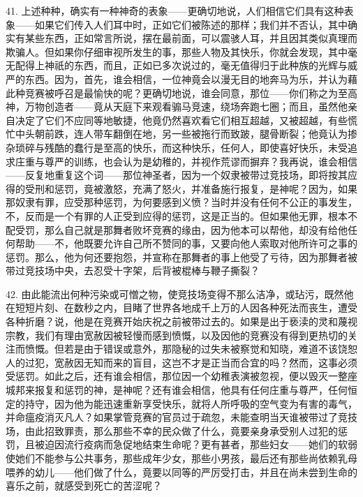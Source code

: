 41. 上述种种，确实有一种神奇的表象——更确切地说，人们相信它们具有这种表象——如果它们传入人们耳中时，正如它们被陈述的那样；我们并不否认，其中确实有某些东西，正如常言所说，摆在最前面，可以震骇人耳，并且因其类似真理而欺骗人。但如果你仔细审视所发生的事，那些人物及其快乐，你就会发现，其中毫无配得上神祇的东西，而且，正如已多次说过的，毫无值得归于此种族的光辉与威严的东西。因为，首先，谁会相信，一位神竟会以漫无目的地奔马为乐，并认为藉此种竞赛被呼召是最愉快的呢？更确切地说，谁会同意，那位——你们称之为至高神，万物创造者——竟从天庭下来观看骟马竞速，绕场奔跑七圈；而且，虽然他亲自决定了它们不应同等地敏捷，他竟仍然喜欢看它们相互超越，又被超越，有些慌忙中头朝前跌，连人带车翻倒在地，另一些被拖行而致跛，腿骨断裂；他竟认为掺杂琐碎与残酷的蠢行是至高的快乐，而这种快乐，任何人，即使喜好快乐，未受追求庄重与尊严的训练，也会认为是幼稚的，并视作荒谬而摒弃？我再说，谁会相信——反复地重复这个词——那位神圣者，因为一个奴隶被带过竞技场，即将按其应得的受刑和惩罚，竟被激怒，充满了怒火，并准备施行报复，是神呢？因为，如果那奴隶有罪，应受那种惩罚，为何要感到义愤？当时并没有任何不公正的事发生，不，反而是一个有罪的人正受到应得的惩罚，这是正当的。但如果他无罪，根本不配受罚，那么自己就是那舞者败坏竞赛的缘由，因为他本可以帮他，却没有给他任何帮助——不，他既要允许自己所不赞同的事，又要向他人索取对他所许可之事的惩罚。那么，他为何还要抱怨，并宣称在那舞者的事上他受了亏待，因为那舞者被带过竞技场中央，去忍受十字架，后背被棍棒与鞭子撕裂？\par

42. 由此能流出何种污染或可憎之物，使竞技场变得不那么洁净，或玷污，既然他在短短片刻、在数秒之内，目睹了世界各地成千上万的人因各种死法而丧生，遭受各种折磨？说，他是在竞赛开始庆祝之前被带过去的。如果是出于亵渎的灵和蔑视宗教，我们有理由宽赦因被轻慢而感到愤慨，以及因他的竞赛没有得到更热切的关注而愤慨。但若是由于错误或意外，那隐秘的过失未被察觉和知晓，难道不该饶恕人的过犯，宽赦因无知而来的盲目，这岂不才是正当而合宜的吗？然而，这事必须受惩罚。如此之后，还有谁会相信，那位因一个幼稚表演被忽视，便以毁灭一整座城邦来报复和惩罚的神，是神呢？还有谁会相信，他具有任何庄重与尊严，任何恒定的持守，因为他为能迅速重新享受快乐，就将人所呼吸的空气变为有害的毒气，并命瘟疫消灭凡人？如果掌管竞赛的官员过于疏忽，未能查明当天谁被带过了竞技场，由此招致罪责，那么那些不幸的民众做了什么，竟要亲身承受别人过犯的惩罚，且被迫因流行疫病而急促地结束生命呢？更有甚者，那些妇女——她们的软弱使她们不能参与公共事务，那些成年少女，那些小男孩，最后还有那些尚依赖乳母喂养的幼儿——他们做了什么，竟要以同等的严厉受打击，并且在尚未尝到生命的喜乐之前，就感受到死亡的苦涩呢？\par

